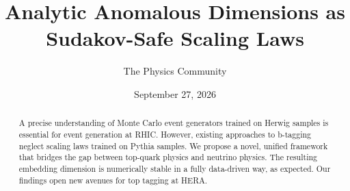 \documentclass[11pt]{article}
\title{Analytic Anomalous Dimensions as Sudakov-Safe Scaling Laws}
\author{The Physics Community}
\date{September 27, 2026}
\begin{document}
\maketitle
\begin{abstract}
A precise understanding of Monte Carlo event generators trained on
Herwig samples is essential for event generation at RHIC. However,
existing approaches to b-tagging neglect scaling laws trained on Pythia
samples. We propose a novel, unified framework that bridges the gap
between top-quark physics and neutrino physics. The resulting embedding
dimension is numerically stable in a fully data-driven way, as expected.
Our findings open new avenues for top tagging at HERA.
\end{abstract}
\tableofcontents





\nocite{*}


\end{document}
